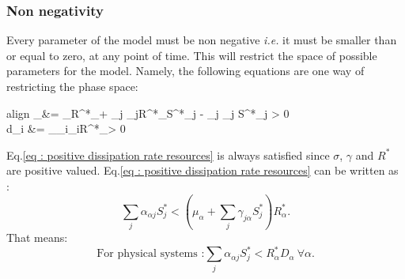 \documentclass[12pt]{article}
\newcommand{\ie}{\textit{i.e.} }
\begin{document}
			\subsubsection{Non negativity}
	Every parameter of the model must be non negative \ie it must be smaller than or equal to zero, at any point of time. This will restrict the space of possible parameters for the model. Namely, the following equations are one way of restricting the phase space:
	\begin{empheq}[left = \empheqlbrace]{align}
		\theta_\alpha &= \mu_\alpha R^*_\alpha + \sum_j \gamma_{j\alpha}R^*_\alpha S^*_j - \sum_j \alpha_{\alpha j} S^*_j > 0 \label{eq : positive feeding rates}\\
		d_i &= \sum_\beta \sigma_{i\beta}\gamma_{i\beta}R^*_\beta > 0 \label{eq : positive dissipation rate resources}
	\end{empheq}
	Eq.\eqref{eq : positive dissipation rate resources} is always satisfied since $\sigma$, $\gamma$ and $R^*$ are positive valued. Eq.\eqref{eq : positive dissipation rate resources} can be written as :
	\begin{equation}
		\sum_j \alpha_{\alpha j} S^*_j < \left(\mu_\alpha+\sum_j \gamma_{j\alpha}S^*_j\right)R^*_\alpha.
	\end{equation}
	That means:
	\begin{equation}
		\boxed{\text{For physical systems :} \sum_j \alpha_{\alpha j} S^*_j < R^*_\alpha D_\alpha \ \forall \alpha.}
	\end{equation}
	
	
\end{document}
